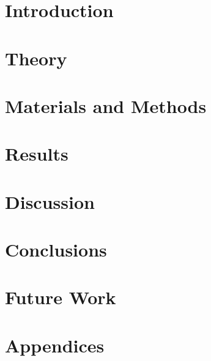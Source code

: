 \documentclass[a4paper, 12pt, openany]{report} %
\begin{document}

\chapter{Introduction}

\cleardoublepage


\chapter{Theory}

\cleardoublepage


\chapter{Materials and Methods}

\cleardoublepage


\chapter{Results}

\cleardoublepage


\chapter{Discussion}

\cleardoublepage

\chapter{Conclusions}

\cleardoublepage

\chapter{Future Work}

\cleardoublepage


\printbibliography[title={References}] 

\cleardoublepage


\chapter*{\LARGE \textbf{Appendices}}
\fancyhf{} %
\renewcommand{\headrulewidth}{0pt} %
\fancyfoot[C]{\thepage} %

\appendix

\end{document}

